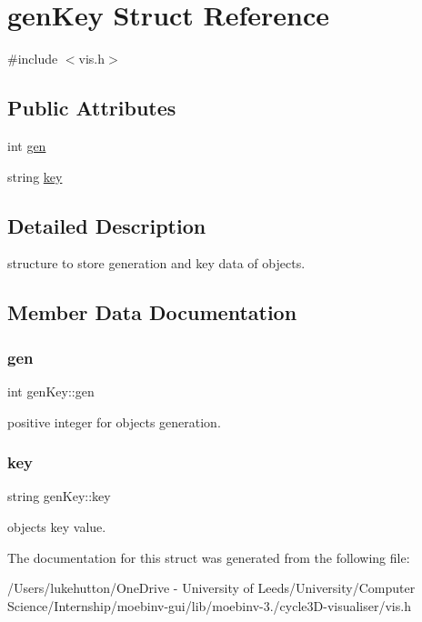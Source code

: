\hypertarget{structgen_key}{}\section{gen\+Key Struct Reference}
\label{structgen_key}


{\ttfamily \#include $<$vis.\+h$>$}

\subsection*{Public Attributes}
\begin{DoxyCompactItemize}
\item 
int \mbox{\hyperlink{structgen_key_ae5256faedda05a8b25b760c8bdeb75c4}{gen}}
\item 
string \mbox{\hyperlink{structgen_key_a76a2731affcdaf847724d065a9140000}{key}}
\end{DoxyCompactItemize}


\subsection{Detailed Description}
structure to store generation and key data of objects. 

\subsection{Member Data Documentation}
\mbox{\label{structgen_key_ae5256faedda05a8b25b760c8bdeb75c4}} 
\subsubsection{\texorpdfstring{gen}{gen}}
{\footnotesize\ttfamily int gen\+Key\+::gen}

positive integer for object\textquotesingle{}s generation. \mbox{\label{structgen_key_a76a2731affcdaf847724d065a9140000}} 
\subsubsection{\texorpdfstring{key}{key}}
{\footnotesize\ttfamily string gen\+Key\+::key}

object\textquotesingle{}s key value. 

The documentation for this struct was generated from the following file\+:\begin{DoxyCompactItemize}
\item 
/\+Users/lukehutton/\+One\+Drive -\/ University of Leeds/\+University/\+Computer Science/\+Internship/moebinv-\/gui/lib/moebinv-\/3./cycle3\+D-\/visualiser/vis.\+h\end{DoxyCompactItemize}
